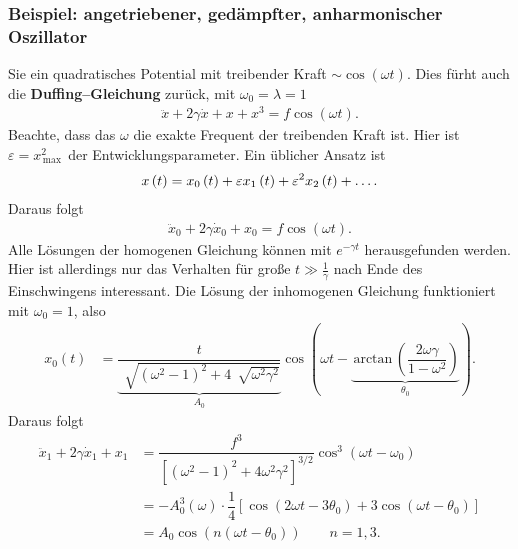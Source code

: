 \documentclass[a4paper,12pt]{article}
\numberwithin{equation}{section}
\begin{document}
\subsubsection{Beispiel: angetriebener, gedämpfter, anharmonischer Oszillator}
Sie ein quadratisches Potential mit treibender Kraft $\sim \cos \left(\omega t\right)$. Dies fürht auch die \textbf{Duffing--Gleichung} zurück, mit $\omega _0=\lambda =1$ 
\begin{align*} 
        \ddot{x}+2\gamma \dot{x}+x+x^3=f\cos \left(\omega t\right)
.\end{align*} 
Beachte, dass das $\omega $ die exakte Frequent der treibenden Kraft ist. Hier ist $\varepsilon =x_{\,\text{max}\,}^2$ der Entwicklungsparameter. Ein üblicher Ansatz ist
\begin{align} 
        x\left(t\right)=x_0\left(t\right)+\varepsilon x_1\left(t\right)+\varepsilon ^2x_2\left(t\right)+\hdots 
        \stepcounter{equation}\stepcounter{equation}\stepcounter{equation}\stepcounter{equation}\stepcounter{equation}\stepcounter{equation}\stepcounter{equation}\stepcounter{equation}\stepcounter{equation}\stepcounter{equation}\stepcounter{equation}\stepcounter{equation}\stepcounter{equation}\stepcounter{equation}\stepcounter{equation}
.\end{align} 
Daraus folgt
\begin{align} 
        \ddot{x}_0+2\gamma \dot{x}_0+x_0=f\cos \left(\omega t\right)
.\end{align} 
Alle Lösungen der homogenen Gleichung können mit $e ^{-\gamma t}$ herausgefunden werden. Hier ist allerdings nur das Verhalten für große $t\gg\tfrac{1}{\gamma }$ nach Ende des Einschwingens interessant. Die Lösung der inhomogenen Gleichung funktioniert mit $\omega _0=1$, also
\begin{align} 
        x_0\left(t\right)&=\underbrace{\dfrac{t}{\,\sqrt[]{\left(\omega ^2-1\right)^2+4\,\sqrt[]{\omega ^2\gamma ^2} } }}_{A_0}\cos \left(\omega t-\underbrace{\,\text{arctan}\,\left(\dfrac{2\omega \gamma }{1-\omega ^2}\right)}_{\theta _0}\right)\label{eq:9.49}
.\end{align} 
Daraus folgt
\begin{align} 
        \ddot{x}_1+2\gamma \dot{x}_1+x_1&=\dfrac{f^3}{\left[\left(\omega ^2-1\right)^2+4\omega ^2\gamma ^2\right]^{3/2}}\cos ^3\left(\omega t-\omega _0\right)\nonumber \\
                                        &=-A_0^3\left(\omega \right)\cdot \dfrac{1}{4}\left[\cos \left(2\omega t-3\theta _0\right)+3\cos \left(\omega t-\theta _0\right)\right]\label{eq:9.50}\\
                                        &=A_0\cos \left(n\left(\omega t-\theta _0\right)\right)\qquad n=1,3\nonumber 
.\end{align} 
\end{document}
